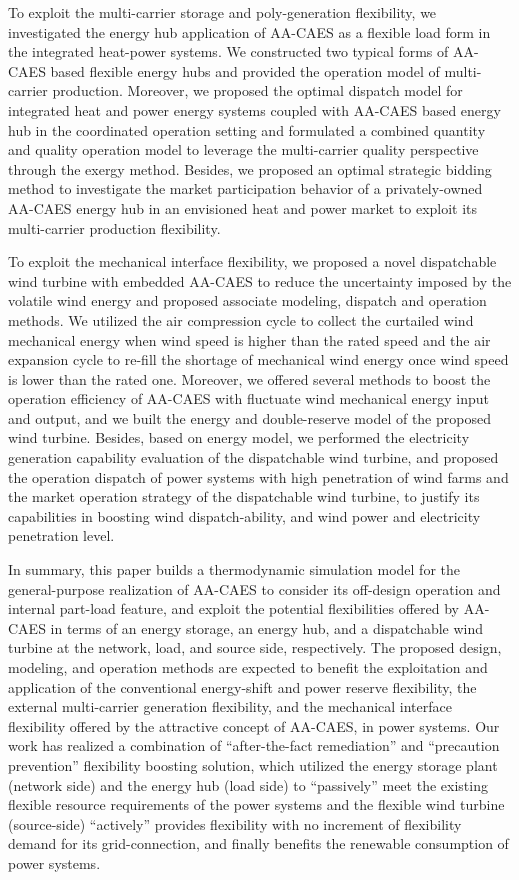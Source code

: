 \begin{eabstract}
To exploit the multi-carrier storage and poly-generation flexibility, we investigated the energy hub application of AA-CAES as a flexible load form in the integrated heat-power systems. We constructed two typical forms of AA-CAES based flexible energy hubs and provided the operation model of multi-carrier production. Moreover, we proposed the optimal dispatch model for integrated heat and power energy systems coupled with AA-CAES based energy hub in the coordinated operation setting and formulated a combined quantity and quality operation model to leverage the multi-carrier quality perspective through the exergy method. Besides, we proposed an optimal strategic bidding method to investigate the market participation behavior of a privately-owned AA-CAES energy hub in an envisioned heat and power market to exploit its multi-carrier production flexibility.

To exploit the mechanical interface flexibility, we proposed a novel dispatchable wind turbine with embedded AA-CAES to reduce the uncertainty imposed by the volatile wind energy and proposed associate modeling, dispatch and operation methods. We utilized the air compression cycle to collect the curtailed wind mechanical energy when wind speed is higher than the rated speed and the air expansion cycle to re-fill the shortage of mechanical wind energy once wind speed is lower than the rated one. Moreover, we offered several methods to boost the operation efficiency of AA-CAES with fluctuate wind mechanical energy input and output, and we built the energy and double-reserve model of the proposed wind turbine. Besides, based on energy model, we performed the electricity generation capability evaluation of the dispatchable wind turbine, and proposed the operation dispatch of power systems with high penetration of wind farms and the market operation strategy of the dispatchable wind turbine, to justify its capabilities in boosting wind dispatch-ability, and wind power and electricity penetration level. 

In summary, this paper builds a thermodynamic simulation model for the general-purpose realization of AA-CAES to consider its off-design operation and internal part-load feature, and exploit the potential flexibilities offered by AA-CAES in terms of an energy storage, an energy hub, and a dispatchable wind turbine at the network, load, and source side, respectively. The proposed design, modeling, and operation methods are expected to benefit the exploitation and application of the conventional energy-shift and power reserve flexibility, the external multi-carrier generation flexibility, and the mechanical interface flexibility offered by the attractive concept of AA-CAES, in power systems. Our work has realized a combination of “after-the-fact remediation” and “precaution prevention” flexibility boosting solution, which utilized the energy storage plant (network side) and the energy hub (load side) to “passively” meet the existing flexible resource requirements of the power systems and the flexible wind turbine (source-side) “actively” provides flexibility with no increment of flexibility demand for its grid-connection, and finally benefits the renewable consumption of power systems.
\end{eabstract}

